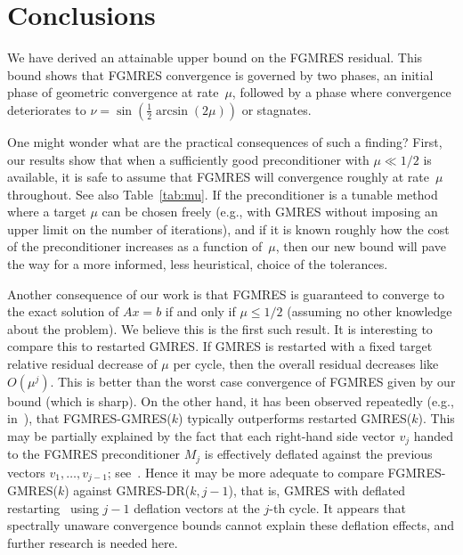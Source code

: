 \documentclass{siamart251216}
\begin{document}
{\section{Conclusions}\label{sec:concl}
We have derived an attainable upper bound on the FGMRES residual. This bound shows that FGMRES convergence is governed by two phases, an initial phase of geometric convergence at rate~$\mu$, followed by a phase where convergence deteriorates to $\nu = \sin(\frac{1}{2} \arcsin(2\mu))$ or stagnates. 

One might wonder what are the practical consequences of such a finding? First, our results show that when a sufficiently good preconditioner with $\mu\ll 1/2$ is available, it is safe to assume that FGMRES will convergence roughly at rate~$\mu$ throughout. See also Table~\ref{tab:mu}. If the preconditioner is a tunable method where a target $\mu$ can be chosen freely   (e.g., with GMRES without imposing an upper limit on the number of iterations), and if it is known roughly how the cost of the preconditioner increases as a function of~$\mu$, then our new bound will pave the way for a more informed, less heuristical, choice of the tolerances. 

Another consequence of our work is that FGMRES is guaranteed to converge to the exact solution of $Ax=b$ if and only if $\mu\leq 1/2$ (assuming no other knowledge about the problem). We believe this is the first such result. It is interesting to compare this to restarted GMRES. If GMRES is restarted with a fixed target relative residual decrease of $\mu$ per cycle, then the overall residual decreases like $O(\mu^j)$. This is better than the worst case convergence of FGMRES given by our bound (which is sharp). On the other hand, it has been observed repeatedly (e.g., in~\cite{saad1993flexible,simoncini2002flexible,guttel2025stabilizing}), that FGMRES-GMRES($k$) typically outperforms restarted GMRES($k$). This may be partially explained by the fact that each right-hand side vector $v_j$ handed to the \mbox{FGMRES}  preconditioner $M_j$ is effectively deflated against the previous vectors $v_1,\ldots,v_{j-1}$; see~\cite{simoncini2002flexible}. Hence it may be more adequate to compare FGMRES-GMRES($k$) against GMRES-DR($k,j-1$), that is, GMRES with deflated restarting~\cite{Morgan2002} using $j-1$ deflation vectors at the $j$-th cycle. It appears that spectrally unaware convergence bounds cannot explain these deflation effects, and further research is needed here.

}
\end{document}
